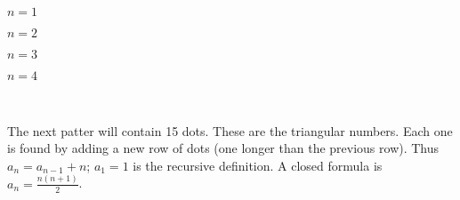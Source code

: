 \documentclass[11pt]{exam}
\def\v{circle (3pt)}
\begin{document}
\vfill
  \begin{multicols}{5}

  \vspace*{\fill}
  \begin{center}

  $n = 1$
  \end{center}

  \columnbreak

  \vspace*{\fill}
    \begin{center}

    $n = 2$
    \end{center}

    \columnbreak

    \vspace*{\fill}
    \begin{center}

    $n = 3$
    \end{center}

    \columnbreak

    \vspace*{\fill}
        \begin{center}

        $n = 4$
        \end{center}

        \columnbreak
     \vspace*{\fill}
     ~
  \end{multicols}

 \begin{solution}
 The next patter will contain 15 dots.  These are the triangular numbers.  Each one is found by adding a new row of dots (one longer than the previous row).  Thus $a_n = a_{n-1} + n$; $a_1 = 1$ is the recursive definition.  A closed formula is $a_n = \frac{n(n+1)}{2}$.

 \end{solution}
\vfill
\end{document}

